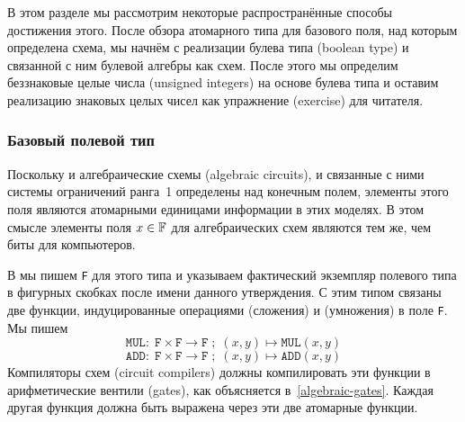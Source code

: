 В этом разделе мы рассмотрим некоторые распространённые способы достижения этого. После обзора атомарного типа для базового поля, над которым определена схема, мы начнём с реализации булева типа (boolean type) и связанной с ним булевой алгебры как схем. После этого мы определим беззнаковые целые числа (unsigned integers) на основе булева типа и оставим реализацию знаковых целых чисел как упражнение (exercise) для читателя.

\subsubsection{Базовый полевой тип}
\label{def:base_field_type}
Поскольку и алгебраические схемы (algebraic circuits), и связанные с ними системы ограничений ранга~1 определены над конечным полем, элементы этого поля являются атомарными единицами информации в этих моделях. В этом смысле элементы поля $x\in \mathbb{F}$ для алгебраических схем являются тем же, чем биты для компьютеров.

В  мы пишем \texttt{F} для этого типа и указываем фактический экземпляр полевого типа в фигурных скобках после имени данного утверждения. С этим типом связаны две функции, индуцированные операциями  (сложения) и  (умножения) в поле \texttt{F}. Мы пишем
\begin{equation}
\mathtt{MUL}:\; \mathtt{F} \times \mathtt{F} \to \mathtt{F}\;;\; (x,y) \mapsto \mathtt{MUL}(x,y)
\end{equation}
\begin{equation}
\mathtt{ADD}:\; \mathtt{F} \times \mathtt{F} \to \mathtt{F}\;;\; (x,y) \mapsto \mathtt{ADD}(x,y)
\end{equation}
Компиляторы схем (circuit compilers) должны компилировать эти функции в арифметические вентили (gates), как объясняется в~\ref{algebraic-gates}. Каждая другая функция должна быть выражена через эти две атомарные функции.

